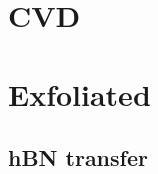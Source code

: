 \documentclass[../Matt_Gebert_Honours_Thesis.tex]{subfiles}
\begin{document}

\section{CVD}

\section{Exfoliated}



\subsection{hBN transfer}
\end{document}
